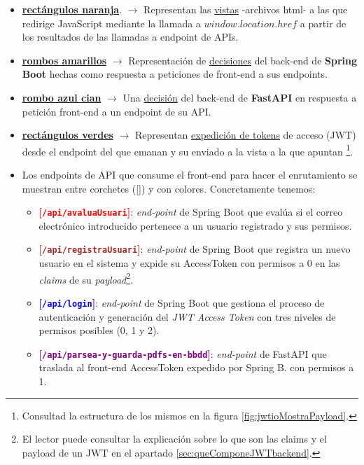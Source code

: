 \documentclass[a4paper,12pt]{report}
\begin{document}
	\begin{itemize}
		\setlength{\itemsep}{-.3em}
		
		\item \textbf{\textcolor{taronjaBrillant}{\underline{rectángulos naranja}}}. $\rightarrow$ Representan las \underline{vistas} -archivos html- a las que redirige JavaScript mediante la llamada a $window.location.href$ a partir de los resultados de las llamadas a endpoint de APIs.
		\item \textbf{\textcolor{yellowfosforito!90!black}{\underline{rombos amarillos}}} $\rightarrow$ Representación de \underline{decisiones} del back-end de \textbf{Spring Boot} hechas como respuesta a peticiones de front-end a sus endpoints.%
		\item \textbf{\textcolor{blauCian}{\underline{rombo azul cian}}} $\rightarrow$ Una \underline{decisión} del back-end de \textbf{FastAPI} en respuesta a petición front-end a un endpoint de su API. 
		
		\item\textbf{\textcolor{green!70!white}{\underline{rectángulos verdes}}} $\rightarrow$ Representan \underline{expedición de tokens} de acceso (JWT) desde el endpoint del que emanan y su enviado a la vista a la que apuntan \footnote{Consultad la estructura de los mismos en la figura \ref{fig:jwtioMostraPayload}.}.
		
		\item Los endpoints de API que consume el front-end para hacer el enrutamiento se muestran entre corchetes ([]) y con colores. Concretamente tenemos:
		
		\begin{itemize}
			\setlength{\itemsep}{.0em}
			\item \textbf{\textcolor{red}{[\texttt{/api/avaluaUsuari}]}}: \textit{end-point} de Spring Boot que evalúa si el correo electrónico introducido pertenece a un usuario registrado y sus permisos.
			\item \textbf{\textcolor{brown}{[\texttt{/api/registraUsuari}]}}: \textit{end-point} de Spring Boot que registra un nuevo usuario en el sistema y expide su AccessToken con permisos a 0 en las \textit{claims} de su \textit{payload}\footnote{El lector puede consultar la explicación sobre lo que son las claims y el payload de un JWT en el apartado \ref{sec:queComponeJWTbackend}.}.
			\item \textbf{\textcolor{blue}{[\texttt{/api/login}]}}: \textit{end-point} de Spring Boot que gestiona el proceso de autenticación y generación del \textit{JWT Access Token} con tres niveles de permisos posibles (0, 1 y 2).
			\item\textbf{\textcolor{purple}{[\texttt{/api/parsea-y-guarda-pdfs-en-bbdd}]}}: \textit{end-point} de FastAPI que traslada al front-end AccessToken expedido por Spring B. con permisos a 1.
		\end{itemize}
		

\end{itemize}
\end{document}
